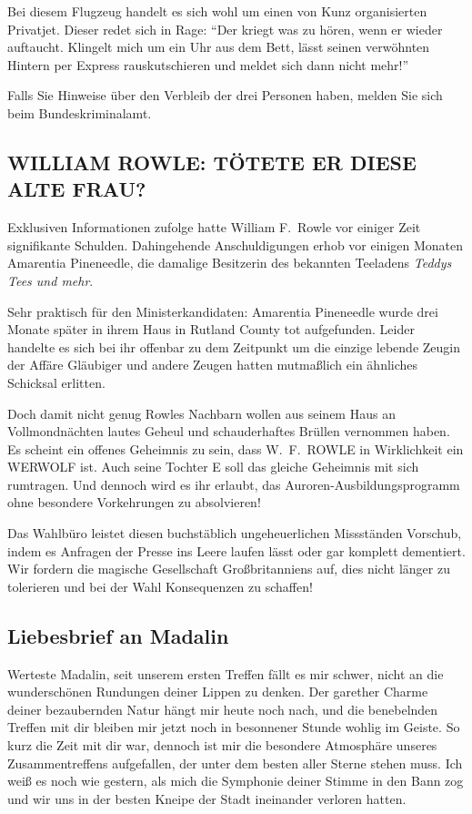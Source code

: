 \documentclass[final]{multiversum}
\begin{document}
Bei diesem Flugzeug handelt es sich wohl um einen von Kunz organisierten
Privatjet. Dieser redet sich in Rage: \enquote{Der kriegt was zu hören, wenn er
wieder auftaucht. Klingelt mich um ein Uhr aus dem Bett, lässt seinen
verwöhnten Hintern per Express rauskutschieren und meldet sich dann nicht mehr!}

Falls Sie Hinweise über den Verbleib der drei Personen haben, melden Sie sich
beim Bundeskriminalamt.

\subsection{WILLIAM ROWLE: TÖTETE ER DIESE ALTE FRAU?}
Exklusiven Informationen zufolge hatte William F.\ Rowle vor einiger Zeit
signifikante Schulden. Dahingehende Anschuldigungen erhob vor einigen Monaten
Amarentia Pineneedle, die damalige Besitzerin des bekannten Teeladens
\emph{Teddys Tees und mehr}.

Sehr praktisch für den Ministerkandidaten: Amarentia Pineneedle wurde drei
Monate später in ihrem Haus in Rutland County tot aufgefunden. Leider handelte
es sich bei ihr offenbar zu dem Zeitpunkt um die einzige lebende Zeugin der
Affäre \textendash{} Gläubiger und andere Zeugen hatten mutmaßlich ein ähnliches
Schicksal erlitten.

Doch damit nicht genug \textendash{} Rowles Nachbarn wollen aus seinem Haus an
Vollmondnächten lautes Geheul und schauderhaftes Brüllen vernommen haben. Es
scheint ein offenes Geheimnis zu sein, dass W.\ F.\ ROWLE in Wirklichkeit ein
WERWOLF ist. Auch seine Tochter E soll das gleiche Geheimnis mit
sich rumtragen. Und dennoch wird es ihr erlaubt, das Auroren-Ausbildungsprogramm
ohne besondere Vorkehrungen zu absolvieren!

Das Wahlbüro leistet diesen buchstäblich ungeheuerlichen Missständen Vorschub,
indem es Anfragen der Presse ins Leere laufen lässt oder gar komplett
dementiert. Wir fordern die magische Gesellschaft Großbritanniens auf, dies
nicht länger zu tolerieren und bei der Wahl Konsequenzen zu schaffen!

\subsection{Liebesbrief an Madalin}
Werteste Madalin, seit unserem ersten Treffen fällt es mir schwer, nicht an die
wunderschönen Rundungen deiner Lippen zu denken.  Der garether Charme deiner
bezaubernden Natur hängt mir heute noch nach, und die benebelnden Treffen mit
dir bleiben mir jetzt noch in besonnener Stunde wohlig im Geiste.  So kurz die
Zeit mit dir war, dennoch ist mir die besondere Atmosphäre unseres
Zusammentreffens aufgefallen, der unter dem besten aller Sterne stehen muss. Ich
weiß es noch wie gestern, als mich die Symphonie deiner Stimme in den Bann zog
und wir uns in der besten Kneipe der Stadt ineinander verloren hatten.
\end{document}
